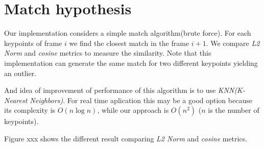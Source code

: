 \section{Match hypothesis}

Our implementation considers a simple match algorithm(brute force). For each keypoints of frame $i$ we find the closest match in the frame $i+1$. We compare \textit{L2 Norm} and \textit{cosine} metrics to measure the similarity. Note that this implementation can generate the same match for two different keypoints yielding an outlier.

And idea of improvement of performance of this algorithm is to use \textit{KNN(K-Nearest Neighbors)}. For real time aplication this may be a good option because its complexity is $O(n\log n)$, while our approach is $O(n^2)$ ($n$ is the number of keypoints).

Figure xxx shows the different result comparing \textit{L2 Norm} and \textit{cosine} metrics.
